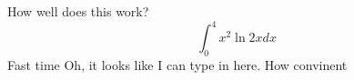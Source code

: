 \documentclass{article}
\begin{document}
How well does this work?
$$\int_0^4 x^2 \ln{2x}dx$$
Fast time
Oh, it looks like I can type in here. 
How convinent
\end{document}
